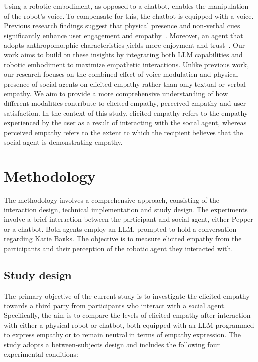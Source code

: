 \documentclass[runningheads]{llncs}
\begin{document}
Using a robotic embodiment, as opposed to a chatbot, enables the manipulation of the robot's voice. To compensate for this, the chatbot is equipped with a voice. Previous research findings suggest that physical presence and non-verbal cues significantly enhance user engagement and empathy~\cite{lee,wainer}. Moreover, an agent that adopts anthropomorphic characteristics yields more enjoyment and trust~\cite{klein}. Our work aims to build on these insights by integrating both LLM capabilities and robotic embodiment to maximize empathetic interactions. Unlike previous work, our research focuses on the combined effect of voice modulation and physical presence of social agents on elicited empathy rather than only textual or verbal empathy. We aim to provide a more comprehensive understanding of how different modalities contribute to elicited empathy, perceived empathy and user satisfaction. In the context of this study, elicited empathy refers to the empathy experienced by the user as a result of interacting with the social agent, whereas perceived empathy refers to the extent to which the recipient believes that the social agent is demonstrating empathy.

\section{Methodology}
\vspace{-0.5em}
The methodology involves a comprehensive approach, consisting of the interaction design, technical implementation and study design. The experiments involve a brief interaction between the participant and social agent, either Pepper or a chatbot. Both agents employ an LLM, prompted to hold a conversation regarding Katie Banks. The objective is to measure elicited empathy from the participants and their perception of the robotic agent they interacted with.

\subsection{Study design}
The primary objective of the current study is to investigate the elicited empathy towards a third party from participants who interact with a social agent. Specifically, the aim is to compare the levels of elicited empathy after interaction with either a physical robot or chatbot, both equipped with an LLM programmed to express empathy or to remain neutral in terms of empathy expression. The study adopts a between-subjects design and includes the following four experimental conditions:
\end{document}
